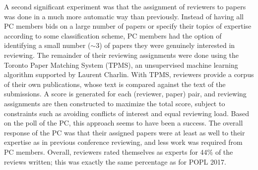 \documentclass[11pt]{article}
\begin{document}
A second significant experiment was that the assignment of
reviewers to papers was done in a much more automatic way than
previously. Instead of having all PC members bids on a large number
of papers or specify their topics of expertise according to some
classification scheme, PC members had the option of identifying a
small number ($\sim\!3$) of papers they were genuinely interested in
reviewing. The remainder of their reviewing assignments were done
using the Toronto Paper Matching System (TPMS), an unsupervised
machine learning algorithm supported by Laurent Charlin. With TPMS, reviewers
provide a corpus of their own publications, whose text is compared
against the text of the submissions. A score is generated for each
(reviewer, paper) pair, and reviewing assignments are then constructed
to maximize the total score, subject to constraints such as
avoiding conflicts of interest and equal reviewing load. Based on
the poll of the PC, this approach seems to have been a success.  The
overall response of the PC was that their assigned papers were
at least as well to their expertise as in previous conference
reviewing, and less work was required from PC members. Overall,
reviewers rated themselves as experts for 44\% of the reviews written;
this was exactly the same percentage as for POPL 2017.
\end{document}
